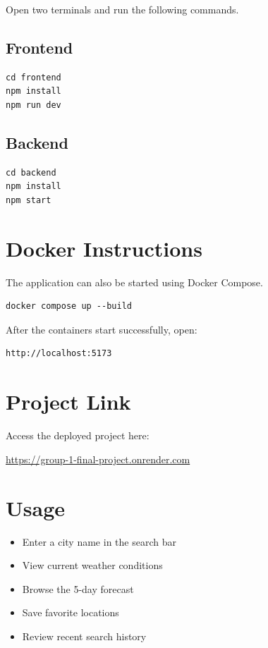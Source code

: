 \documentclass{article}
\begin{document}
Open two terminals and run the following commands.

\subsection*{Frontend}

\begin{verbatim}
cd frontend
npm install
npm run dev
\end{verbatim}

\subsection*{Backend}

\begin{verbatim}
cd backend
npm install
npm start
\end{verbatim}

\section{Docker Instructions}

The application can also be started using Docker Compose.

\begin{verbatim}
docker compose up --build
\end{verbatim}

After the containers start successfully, open:

\begin{verbatim}
http://localhost:5173
\end{verbatim}

\section{Project Link}

Access the deployed project here:

\href{https://group-1-final-project.onrender.com}
{https://group-1-final-project.onrender.com}

\section{Usage}

\begin{itemize}[leftmargin=*]
    \item Enter a city name in the search bar
    \item View current weather conditions
    \item Browse the 5-day forecast
    \item Save favorite locations
    \item Review recent search history
\end{itemize}
\end{document}
